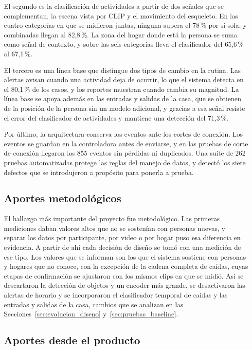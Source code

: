 El segundo es la clasificación de actividades a partir de dos señales que se complementan, la escena vista por CLIP y el movimiento del esqueleto.
En las cuatro categorías en que se midieron juntas, ninguna supera el 78\,\% por sí sola, y combinadas llegan al 82,8\,\%.
La zona del hogar donde está la persona se suma como señal de contexto, y sobre las seis categorías lleva el clasificador del 65,6\,\% al 67,1\,\%.

El tercero es una línea base que distingue dos tipos de cambio en la rutina.
Las alertas avisan cuando una actividad deja de ocurrir, lo que el sistema detecta en el 80,1\,\% de los casos, y los reportes muestran cuando cambia su magnitud.
La línea base se apoya además en las entradas y salidas de la casa, que se obtienen de la posición de la persona sin un modelo adicional, y gracias a esa señal resiste el error del clasificador de actividades y mantiene una detección del 71,3\,\%.

Por último, la arquitectura conserva los eventos ante los cortes de conexión.
Los eventos se guardan en la controladora antes de enviarse, y en las pruebas de corte de conexión llegaron los 855 eventos sin pérdidas ni duplicados.
Una suite de 262 pruebas automatizadas protege las reglas del manejo de datos, y detectó los siete defectos que se introdujeron a propósito para ponerla a prueba.

\subsection{Aportes metodológicos}

El hallazgo más importante del proyecto fue metodológico.
Las primeras mediciones daban valores altos que no se sostenían con personas nuevas, y separar los datos por participante, por video o por hogar puso esa diferencia en evidencia.
A partir de ahí cada decisión de diseño se tomó con una medición de ese tipo.
Los valores que se informan son los que el sistema sostiene con personas y hogares que no conoce, con la excepción de la cadena completa de caídas, cuyas etapas de confirmación se ajustaron con los mismos clips en que se midió.
Así se descartaron la detección de objetos y un encoder más grande, se desactivaron las alertas de horario y se incorporaron el clasificador temporal de caídas y las entradas y salidas de la casa, cambios que se analizan en las Secciones~\ref{sec:evolucion_diseno} y~\ref{sec:pruebas_baseline}.

\subsection{Aportes desde el producto}

